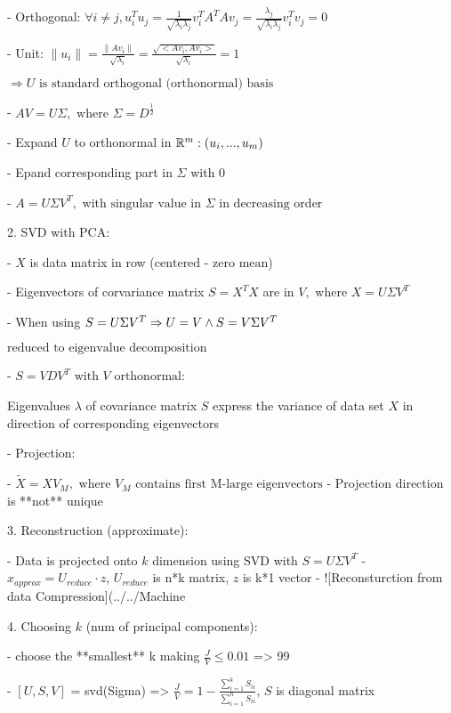 - Orthogonal: $\forall i\neq j, u_i^Tu_j=\frac 1 {\sqrt{\lambda_i\lambda_j}}v_i^TA^TAv_j=\frac {\lambda_j} {\sqrt{\lambda_i\lambda_j}}v_i^Tv_j=0$ 

- Unit: $\|u_i\|=\frac {\|Av_i\|} {\sqrt{\lambda_i}}=\frac {\sqrt {<Av_i,Av_i>}} {\sqrt{\lambda_i}}=1$ 

$\boldsymbol \Rightarrow U \text{ is standard orthogonal (orthonormal) basis}$ 

- $AV=U\Sigma,\text{ where } \Sigma = D^{\frac 1 2}$ 

- Expand $U$ to orthonormal in $\mathbb R^m: \space (u_i,...,u_m)$ 

- Epand corresponding part in $\Sigma$ with $0$ 

- \(A = U\Sigma V^T,\text{ with singular value in $\Sigma$ in decreasing order}\)

2. SVD with PCA:

- $X$ is data matrix in row ($\text{centered - zero mean}$)

- Eigenvectors of corvariance matrix $S=X^TX$ are in $V, \text{ where }X = U\Sigma V^T$ 

- When using $S=U\Sigma V^T \Rightarrow \space U=V \space \land \space S=V\Sigma V^T$ 

	$\text{reduced to eigenvalue decomposition}$ 

- $S=VDV^T \text{ with $V$ orthonormal}$: 

Eigenvalues $\lambda$ of covariance matrix $S$ express the variance of data set $X$ in direction of corresponding eigenvectors

- Projection:

- $\widetilde X = XV_M, \text{ where $V_M$ contains first M-large eigenvectors}$ 
- Projection direction is **not** unique 

3. Reconstruction (approximate): 

- Data is projected onto $k$ dimension using $\text{SVD}$ with $S = U\Sigma V^T$ 
- $x_{approx} = U_{reduce} \cdot z$,  $U_{reduce}$ is n*k matrix, $z$ is k*1 vector
- ![Reconsturction from data Compression](../../Machine%

4. Choosing $k$ (num of principal components):

- choose the **smallest** k making $\displaystyle \frac JV \leq 0.01$ => 99%

- $[U,S,V]$ = svd(Sigma) => $\displaystyle \frac JV=1-\frac {\sum^k_{i=1}S_{ii}}{\sum^n_{i=1}S_{ii}}$, $S$ is diagonal matrix

